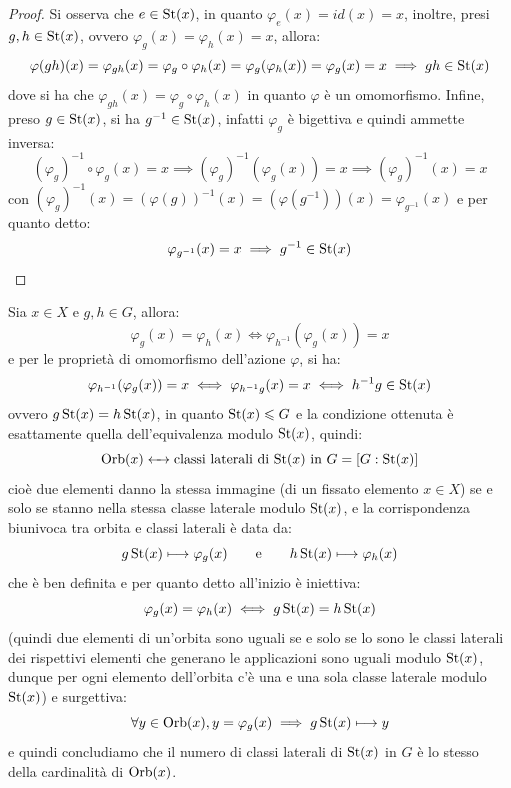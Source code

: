 \documentclass[11pt]{scrartcl}
\begin{document}
\begin{proof}
    Si osserva che $e \in \operatorname{St}(x)$, in quanto $\varphi_e(x) = id(x) = x$, inoltre, presi $g,h \in \operatorname{St}(x)$, ovvero $\varphi_g (x) = \varphi_h(x) = x$, allora:
        \[ \varphi(gh)(x) = \varphi_{gh}(x) = \varphi_g \circ \varphi_h (x) = \varphi_g(\varphi_h(x)) = \varphi_g(x) = x \implies gh \in \operatorname{St}(x)
            \]
    dove si ha che $ \varphi_{gh}(x) = \varphi_g \circ \varphi_h (x)$ in quanto $\varphi$ è un omomorfismo.
    Infine, preso $g \in \operatorname{St}(x)$, si ha $g^{-1} \in \operatorname{St}(x)$, infatti $\varphi_g$ è bigettiva e quindi ammette inversa:
        \[ (\varphi_g)^{-1} \circ \varphi_g (x) = x \implies (\varphi_g)^{-1}(\varphi_g(x)) = x \implies (\varphi_g)^{-1}(x) = x
            \]
    con $(\varphi_g)^{-1}(x) = (\varphi(g))^{-1}(x) = (\varphi(g^{-1}))(x) = \varphi_{g^{-1}}(x)$ e per quanto detto:
        \[ \varphi_{g^{-1}} (x) = x \implies g^{-1} \in \operatorname{St}(x)
            \]
\end{proof}

\pagebreak
\begin{remark}
    Sia $x \in X$ e $g,h \in G$, allora:
        \[ \varphi_g(x) = \varphi_h(x) \iff \varphi_{h^{-1}}(\varphi_g(x)) = x
            \]
    e per le proprietà di omomorfismo dell'azione $\varphi$, si ha:
        \[ \varphi_{h^{-1}}(\varphi_g(x)) = x \iff \varphi_{h^{-1}g}(x) = x \iff h^{-1}g \in \operatorname{St}(x)
            \]
    ovvero $g \operatorname{St}(x) = h \operatorname{St}(x)$, in quanto $\operatorname{St}(x) \leqslant G$ e la condizione ottenuta è esattamente quella dell'equivalenza modulo $\operatorname{St}(x)$,
    quindi:
    \[ \operatorname{Orb}(x) \leftarrow\mathrel{\mkern-7mu}\rightarrow \text{classi laterali di $\operatorname{St}(x)$ in $G$} = [G : \operatorname{St}(x)]
        \]
    cioè due elementi danno la stessa immagine (di un fissato elemento $x \in X$) se e solo se stanno nella stessa classe laterale modulo $\operatorname{St}(x)$, e la corrispondenza biunivoca tra orbita e classi
    laterali è data da:
    \[ g\operatorname{St}(x) \longmapsto \varphi_g(x) \qquad \text e \qquad h\operatorname{St}(x) \longmapsto \varphi_h(x)
                \]
    che è ben definita e per quanto detto all'inizio è iniettiva:
        \[ \varphi_g(x) = \varphi_h(x) \iff g\operatorname{St}(x) = h\operatorname{St}(x)
            \]
    (quindi due elementi di un'orbita sono uguali se e solo se lo sono le classi laterali dei rispettivi elementi che generano le applicazioni sono uguali modulo $\operatorname{St}(x)$, dunque per ogni elemento
    dell'orbita c'è una e una sola classe laterale modulo $\operatorname{St}(x)$) e surgettiva:
        \[ \forall y \in \operatorname{Orb}(x), y = \varphi_g(x) \implies g\operatorname{St}(x) \longmapsto y
            \]
    e quindi concludiamo che il numero di classi laterali di $\operatorname{St}(x)$ in $G$ è lo stesso della cardinalità di $\operatorname{Orb}(x)$.
\end{remark}
\end{document}
